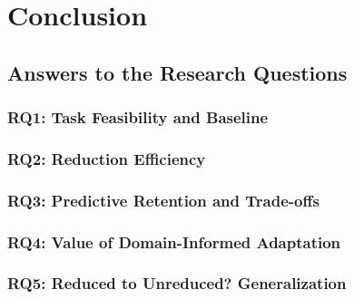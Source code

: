 \chapter{Conclusion}
\label{sec:conclusion}

\section{Answers to the Research Questions}
\label{sec:conclusion:answers}

\subsection{RQ1: Task Feasibility and Baseline}
\label{sec:conclusion:rq1}

\subsection{RQ2: Reduction Efficiency}
\label{sec:conclusion:rq2}

\subsection{RQ3: Predictive Retention and Trade-offs}
\label{sec:conclusion:rq3}

\subsection{RQ4: Value of Domain-Informed Adaptation}
\label{sec:conclusion:rq4}

\subsection{RQ5: Reduced to Unreduced? Generalization}
\label{sec:conclusion:rq5}


